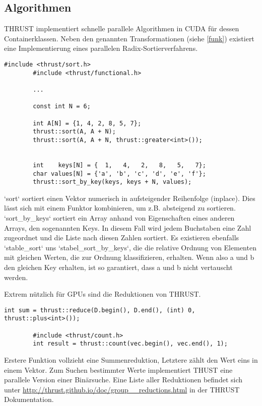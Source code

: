 		\subsection{Algorithmen}\label{algo}
		THRUST implementiert schnelle parallele Algorithmen in CUDA für dessen Containerklassen. Neben den genannten Transformationen (siehe \ref{funk}) existiert eine Implementierung eines parallelen Radix-Sortierverfahrens.
		\begin{lstlisting}[caption=THRUST Sortieren]	
		#include <thrust/sort.h>
		#include <thrust/functional.h>
		
		...
		
		const int N = 6;
		
		int A[N] = {1, 4, 2, 8, 5, 7};
		thrust::sort(A, A + N);
		thrust::sort(A, A + N, thrust::greater<int>());


		int    keys[N] = {  1,   4,   2,   8,   5,   7};
		char values[N] = {'a', 'b', 'c', 'd', 'e', 'f'};
		thrust::sort_by_key(keys, keys + N, values);
		\end{lstlisting}
		
		\li`sort` sortiert einen Vektor numerisch in aufsteigender Reihenfolge (inplace). Dies lässt sich mit einem Funktor kombinieren, um z.B. absteigend zu sortieren. \li`sort_by_keys` sortiert ein Array anhand von Eigenschaften eines anderen Arrays, den sogenannten Keys. In diesem Fall wird jedem Buchstaben eine Zahl zugeordnet und die Liste nach diesen Zahlen sortiert. Es existieren ebenfalls \li`stable_sort` uns \li`stabel_sort_by_keys`, die die relative Ordnung von Elementen mit gleichen Werten, die zur Ordnung klassifizieren, erhalten. Wenn also a und b den gleichen Key erhalten, ist so garantiert, dass a und b nicht vertauscht werden.
		
		\newpage
		Extrem nützlich für GPUs sind die Reduktionen von THRUST.
		\begin{lstlisting}[caption=THRUST Reduktionen]
		int sum = thrust::reduce(D.begin(), D.end(), (int) 0, thrust::plus<int>());
		
		#include <thrust/count.h>
		int result = thrust::count(vec.begin(), vec.end(), 1);
		\end{lstlisting}
		
		Erstere Funktion vollzieht eine Summenreduktion, Letztere zählt den Wert eins in einem Vektor. Zum Suchen bestimmter Werte implementiert THUST eine parallele Version einer Binärsuche. Eine Liste aller Reduktionen befindet sich unter \url{http://thrust.github.io/doc/group__reductions.html} in der THRUST Dokumentation. \autocite{thrustDoc}
		
